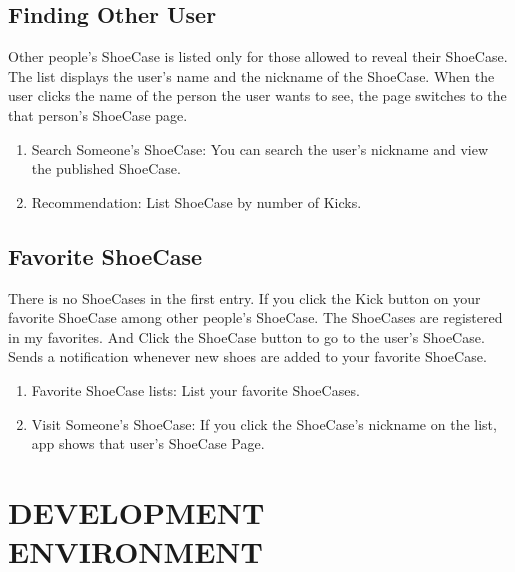 \documentclass[conference]{IEEEtran}
\begin{document}
\subsection{Finding Other User}

Other people's ShoeCase is listed only for those allowed to reveal their ShoeCase. The list displays the user's name and the nickname of the ShoeCase. When the user clicks the name of the person the user wants to see, the page switches to the that person's ShoeCase page.
\\
\begin{enumerate}
	\item Search Someone's ShoeCase: You can search the user's nickname and view the published ShoeCase.
\\
	\item Recommendation: List ShoeCase by number of Kicks. 
\\
\end{enumerate}

\subsection{Favorite ShoeCase}

There is no ShoeCases in the first entry. If you click the Kick button on your favorite ShoeCase among other people's ShoeCase. The ShoeCases are registered in my favorites. And Click the ShoeCase button to go to the user's ShoeCase. Sends a notification whenever new shoes are added to your favorite ShoeCase. 
\\
\begin{enumerate}
	\item Favorite ShoeCase lists: List your favorite ShoeCases.
	\\
	\item Visit Someone's ShoeCase: If you click the ShoeCase's nickname on the list, app shows that user's ShoeCase Page. 
\\
\end{enumerate}

\section{DEVELOPMENT ENVIRONMENT}
\end{document}
